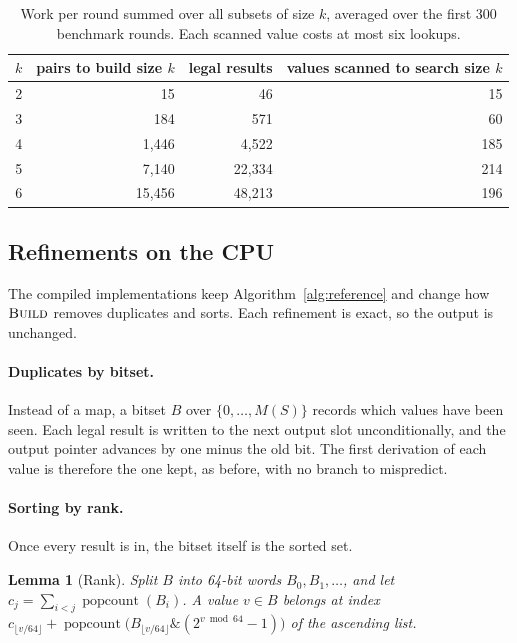 \documentclass[11pt,a4paper]{article}
\newtheorem{lemma}[theorem]{Lemma}
\theoremstyle{definition}
\theoremstyle{remark}
\newcommand{\proc}[1]{\textnormal{\textsc{#1}}}
\begin{document}
\begin{table}[ht]
\centering
\begin{tabular}{rrrr}
\toprule
$k$ & pairs to build size $k$ & legal results & values scanned to search size $k$ \\ \midrule
2 & 15 & 46 & 15 \\
3 & 184 & 571 & 60 \\
4 & 1{,}446 & 4{,}522 & 185 \\
5 & 7{,}140 & 22{,}334 & 214 \\
6 & 15{,}456 & 48{,}213 & 196 \\ \bottomrule
\end{tabular}
\caption{Work per round summed over all subsets of size $k$, averaged over the first 300 benchmark rounds.
Each scanned value costs at most six lookups.}\label{tab:cost}
\end{table}

\subsection{Refinements on the CPU}\label{sec:cpu}

The compiled implementations keep Algorithm~\ref{alg:reference} and change how $\proc{Build}$ removes
duplicates and sorts. Each refinement is exact, so the output is unchanged.

\paragraph{Duplicates by bitset.}
Instead of a map, a bitset $B$ over $\{0, \dots, M(S)\}$ records which values have been seen. Each legal
result is written to the next output slot unconditionally, and the output pointer advances by one minus
the old bit. The first derivation of each value is therefore the one kept, as before, with no branch to
mispredict.

\paragraph{Sorting by rank.}
Once every result is in, the bitset itself is the sorted set.

\begin{lemma}[Rank]\label{lem:rank}
Split $B$ into 64-bit words $B_0, B_1, \dots$, and let $c_j = \sum_{i < j} \operatorname{popcount}(B_i)$. A value
$v \in B$ belongs at index $c_{\lfloor v / 64 \rfloor} + \operatorname{popcount}\bigl(B_{\lfloor v / 64 \rfloor}
\mathbin{\&} (2^{v \bmod 64} - 1)\bigr)$ of the ascending list.
\end{lemma}
\end{document}
